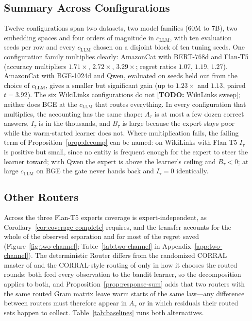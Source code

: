 \documentclass{article}
\theoremstyle{definition}
\theoremstyle{remark}
\theoremstyle{remark}
\newcommand{\todo}[1]{\textcolor{red!70!black}{[\textbf{TODO:} #1]}}
\begin{document}
\subsection{Summary Across Configurations}
\label{app:summary}

Twelve configurations span two datasets, two model families (60M to 7B), two
embedding spaces and four orders of magnitude in $c_{\mathrm{LLM}}$, with ten evaluation
seeds per row and every $c_{\mathrm{LLM}}$ chosen on a disjoint block of ten tuning seeds. One configuration family
multiplies clearly: AmazonCat with BERT-768d and Flan-T5 (accuracy multipliers
$1.71\times$, $2.72\times$, $3.29\times$; regret ratios $1.07$, $1.19$,
$1.27$). AmazonCat with BGE-1024d and Qwen, evaluated on seeds held out from
the choice of $c_{\mathrm{LLM}}$, gives a smaller but significant gain (up to $1.23\times$ and
$1.13$, paired $t=3.92$). The six WikiLinks configurations do not \todo{WikiLinks sweep};
neither does BGE at the $c_{\mathrm{LLM}}$ that routes everything. In every configuration
that multiplies, the accounting has the same shape: $A_\tau$ is at most a few
dozen correct answers, $I_\tau$ is in the thousands, and $B_\tau$ is large because the expert stays poor while the
warm-started learner does not. Where multiplication fails, the failing term of
Proposition~\ref{prop:decomp} can be named: on WikiLinks with Flan-T5
$I_\tau$ is positive but small, since no entity is frequent enough for the
expert to steer the learner toward; with Qwen the expert is above the learner's ceiling and $B_\tau<0$;
at large $c_{\mathrm{LLM}}$ on BGE the gate never hands back and $I_\tau=0$ identically.

\subsection{Other Routers}
\label{app:routers}

Across the three Flan-T5 experts coverage is
expert-independent, as Corollary~\ref{cor:coverage-complete} requires, and the
transfer accounts for the whole of the observed separation and for most of the
regret saved (Figure~\ref{fig:two-channel}; Table~\ref{tab:two-channel} in
Appendix~\ref{app:two-channel}). The deterministic Router differs from the
randomized CORRAL master of \cite{agarwal2017corralling} and the CORRAL-style
routing of \cite{chen2024llmdecision} only in how it chooses the routed
rounds; both feed every observation to the bandit learner, so the
decomposition applies to both, and Proposition~\ref{prop:response-sum} adds
that two routers with the same routed Gram matrix leave warm starts of the
same law---any difference between routers must therefore appear in $A_\tau$ or
in which residuals their routed sets happen to collect.
Table~\ref{tab:baselines} runs both alternatives.
\end{document}
